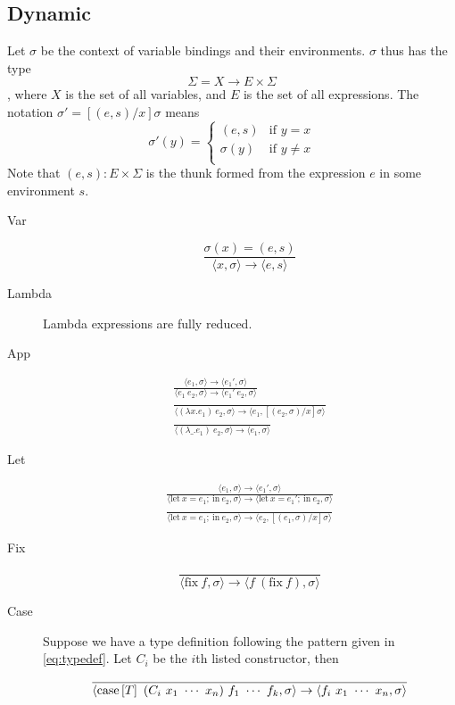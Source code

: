 \documentclass[12pt]{article}
\newcommand{\env}[1]{\langle #1 \rangle}
\newcommand{\thmlet}[2]{\mathrm{let}~#1~\mathrm{in}~#2}
\newcommand{\thmfix}{\mathrm{fix}}
\newcommand{\thmcase}[1]{\mathrm{case}\sbr{#1}}
\begin{document}
\subsection{Dynamic}
\label{sec:dynamic_sem}

Let $\sigma$ be the context of variable bindings and their
environments.
$\sigma$ thus has the type
$$\Sigma = X \to E \times \Sigma$$, where $X$ is the
set of all variables, and $E$ is the set of all expressions.
The notation $\sigma' = [(e, s)/x]\sigma$ means
$$\sigma'(y) =
\begin{cases}
  (e, s) &\text{if } y = x\\
  \sigma(y) &\text{if } y \neq x\\
\end{cases}$$
Note that $(e, s) : E \times \Sigma$ is the thunk formed from the
expression $e$ in some environment $s$.

\begin{description}
\item[Var]
  \begin{equation}
\frac{\sigma(x) = (e, s)}{\env{x, \sigma} \to \env{e, s}}
\end{equation}

\item[Lambda] Lambda expressions are fully reduced.

\item[App] 
  \begin{gather}
    \frac{\env{e_1, \sigma} \to \env{e_1', \sigma}}{\env{e_1~e_2, \sigma} \to \env{e_1'~e_2, \sigma}}\\
    \frac{}{\env{(\lambda x. e_1)~e_2, \sigma} \to \env{e_1, [(e_2, \sigma)/x]\sigma}}\\
    \frac{}{\env{(\lambda \_. e_1)~e_2, \sigma} \to \env{e_1, \sigma}}
  \end{gather}

\item[Let]
  \begin{gather}
    \frac{\env{e_1, \sigma} \to \env{e_1', \sigma}}{\env{\thmlet{x = e_1;}{e_2}, \sigma} \to \env{\thmlet{x = e_1';}{e_2}, \sigma}}\\
    \frac{}{\env{\thmlet{x = e_1;}{e_2}, \sigma} \to \env{e_2, [(e_1, \sigma)/x]\sigma}}
  \end{gather}

\item[Fix]
  \begin{equation}
    \frac{}{\env{\thmfix~f, \sigma} \to \env{f~(\thmfix~f), \sigma}}
  \end{equation}

\item[Case] Suppose we have a type definition following the pattern
  given in \eqref{eq:typedef}.
  Let $C_i$ be the $i$th listed constructor, then
  \begin{gather}
    \frac{}{\env{\thmcase{T}~(C_i~x_1~\cdots~x_n)~f_1~\cdots~f_k, \sigma} \to \env{f_i~x_1~\cdots~x_n, \sigma}}\\
  \end{gather}
\end{description}
\end{document}

